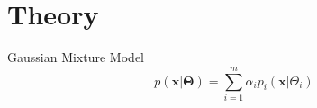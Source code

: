 \chapter{Theory} %
\label{cha:theory}
Gaussian Mixture Model
\begin{equation}
	p(\mathbf{x} \vert \mathbf{\Theta}) = \sum_{i=1}^{m} \alpha_i p_i(\mathbf{x} \vert \Theta_i)
\end{equation}
